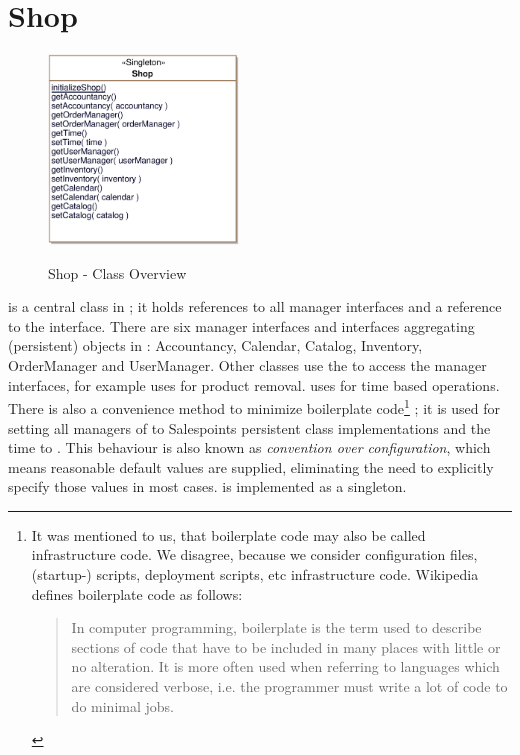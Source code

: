 \section{Shop}
\label{shop}
\label{sec:shop}

\begin{figure}[ht]
	\centering
  \includegraphics[width=0.45\textwidth]{images/Shop_Overview.eps}
	\label{shop_overview}
	\caption{Shop - Class Overview}
\end{figure}
 is a central class in \salespoint{}; it holds references to all manager interfaces and a reference to the  interface.
There are six manager interfaces and interfaces aggregating (persistent) objects in \salespoint{}: Accountancy, Calendar, Catalog, Inventory, OrderManager and UserManager.
Other classes use the  to access the manager interfaces, for example  uses  for product removal.
 uses  for time based operations.
There is also a convenience method to minimize boilerplate code\footnote{
	It was mentioned to us, that boilerplate code may also be called infrastructure code.
	We disagree, because we consider configuration files, (startup-) scripts, deployment scripts, etc infrastructure code.
	Wikipedia defines boilerplate code as follows:
	\begin{quote}
		In computer programming, boilerplate is the term used to describe sections of code that have to be included in many places with little or no alteration.
		It is more often used when referring to languages which are considered verbose, i.e. the programmer must write a lot of code to do minimal jobs.
	\end{quote}}
;
it is used for setting all managers of  to Salespoints persistent class implementations and the time to .
This behaviour is also known as \textit{convention over configuration}, which means reasonable default values are supplied, eliminating the need to explicitly specify those values in most cases.
 is implemented as a singleton.

